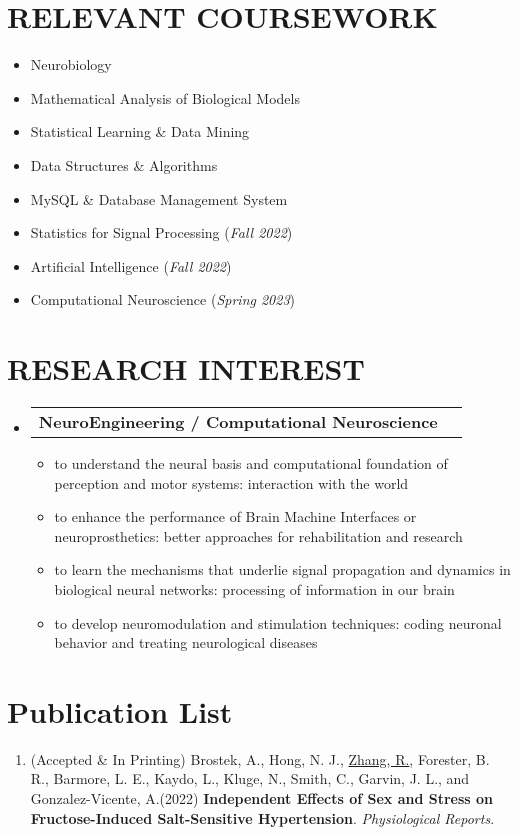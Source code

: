 \documentclass[letterpaper,11pt]{article}
\makeatletter
\newcommand{\resumeItem}[1]{
	\item\small{
		{#1 \vspace{0pt}}
	}
}
\newcommand{\resumeResearchHeading}[2]{
	\vspace{-2pt}\item
	\begin{tabular*}{1.0\textwidth}[t]{l@{\extracolsep{\fill}}r}
		\textbf{#1} & \textbf{\small #2} \\
	\end{tabular*}\vspace{-4pt}
}
\newcommand{\resumeSubHeadingListStart}{\begin{itemize}[leftmargin=0.0in, label={}]}
\newcommand{\resumeSubHeadingListEnd}{\end{itemize}}
\newcommand{\resumeItemListStart}{\begin{itemize}}
\newcommand{\resumeItemListEnd}{\end{itemize}\vspace{-5pt}}
\makeatother
\begin{document}
	\section{RELEVANT COURSEWORK}
	\begin{multicols}{2}
		\begin{itemize}[itemsep=-2pt, parsep=5pt]
			\item\small Neurobiology 
			\item       Mathematical Analysis of Biological Models
			\item       Statistical Learning \& Data Mining
			\item       Data Structures \& Algorithms 
			\item       MySQL \& Database Management System
			\item       Statistics for Signal Processing (\textit{Fall 2022})
			\item       Artificial Intelligence (\textit{Fall 2022})
			\item       Computational Neuroscience (\textit{Spring 2023}) 
		\end{itemize}
	\end{multicols}
	\vspace*{2.0\multicolsep}
	\vspace{7pt}
	
	\section{RESEARCH INTEREST}
	\resumeSubHeadingListStart
		\resumeResearchHeading{NeuroEngineering / Computational Neuroscience}{}
		\resumeItemListStart
			\resumeItem{to understand the neural basis and computational foundation of perception and motor systems: interaction with the world}
			\resumeItem{to enhance the performance of Brain Machine Interfaces or neuroprosthetics: better approaches for rehabilitation and research }
			\resumeItem{to learn the mechanisms that underlie signal propagation and dynamics in biological neural networks: processing of information in our brain}
			\resumeItem{to develop neuromodulation and stimulation techniques: coding neuronal behavior and treating neurological diseases}
		\resumeItemListEnd
	\resumeSubHeadingListEnd      
	
	\section{Publication List}
	\begin{enumerate}[itemsep=-2pt, parsep=5pt]
		\item (Accepted \& In Printing) Brostek, A., Hong, N. J., \underline{Zhang, R.}, Forester, B. R., Barmore, L. E., Kaydo, L., Kluge, N., Smith, C., Garvin, J. L., and Gonzalez-Vicente, A.(2022) \textbf{Independent Effects of Sex and Stress on Fructose-Induced Salt-Sensitive Hypertension}. \textit{Physiological Reports}.
	\end{enumerate}
	
\end{document}
